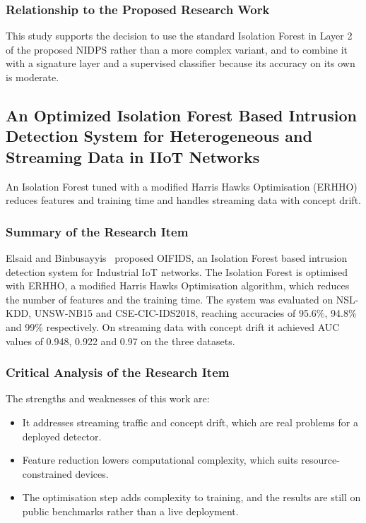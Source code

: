 \subsubsection{Relationship to the Proposed Research Work}\label{sec:3.2.8.3}

\noindent This study supports the decision to use the standard Isolation Forest in Layer 2 of the proposed NIDPS rather than a more complex variant, and to combine it with a signature layer and a supervised classifier because its accuracy on its own is moderate.

\subsection{An Optimized Isolation Forest Based Intrusion Detection System for Heterogeneous and Streaming Data in IIoT Networks}\label{sec:3.2.9}

\noindent An Isolation Forest tuned with a modified Harris Hawks Optimisation (ERHHO) reduces features and training time and handles streaming data with concept drift.

\subsubsection{Summary of the Research Item}\label{sec:3.2.9.1}

\noindent Elsaid and Binbusayyis~\cite{lr:elsaid2024} proposed OIFIDS, an Isolation Forest based intrusion detection system for Industrial IoT networks. The Isolation Forest is optimised with ERHHO, a modified Harris Hawks Optimisation algorithm, which reduces the number of features and the training time. The system was evaluated on NSL-KDD, UNSW-NB15 and CSE-CIC-IDS2018, reaching accuracies of 95.6\%, 94.8\% and 99\% respectively. On streaming data with concept drift it achieved AUC values of 0.948, 0.922 and 0.97 on the three datasets.

\subsubsection{Critical Analysis of the Research Item}\label{sec:3.2.9.2}

\noindent The strengths and weaknesses of this work are:

\begin{itemize}
\item It addresses streaming traffic and concept drift, which are real problems for a deployed detector.
\item Feature reduction lowers computational complexity, which suits resource-constrained devices.
\item The optimisation step adds complexity to training, and the results are still on public benchmarks rather than a live deployment.
\end{itemize}

